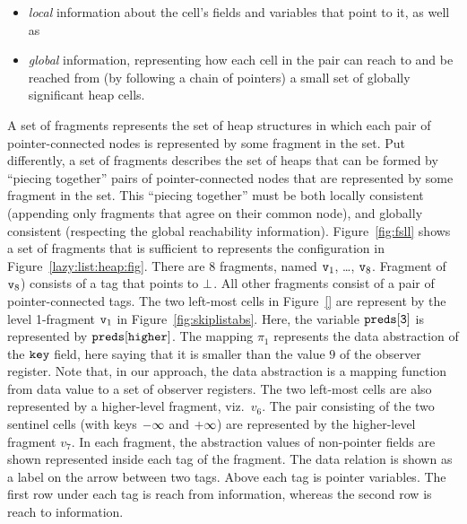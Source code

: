\begin{itemize}
\item {\em local} information about the cell's fields and variables that
  point to it, as well as
\item {\em global} information, representing how
  each cell in the pair can reach to and be reached from
  (by following a chain of pointers) a small set of globally significant
  heap cells.
\end{itemize}
 A set of fragments represents the set of heap
structures in which each pair of pointer-connected nodes is represented by some
fragment in the set.
Put differently, a set of fragments describes the set of heaps that can be formed by
``piecing together'' pairs of pointer-connected nodes that are represented
by some fragment in the set. This ``piecing together'' must
be both locally consistent (appending only fragments that agree on their
common node), and globally consistent (respecting the global reachability
information).
%
Figure~\ref{fig:fsll} shows a set of fragments that is sufficient to
represents the configuration in Figure~\ref{lazy:list:heap:fig}. There are $8$ fragments, named $\mathtt{v}_1$, \ldots , $\mathtt{v}_{8}$. Fragment of
$\mathtt{v}_{8}$) consists of a tag that points to $\bot$. All other fragments consist of a pair of pointer-connected tags. The two left-most cells
in Figure~\ref{} are represent by the level 1-fragment $\mathtt{v}_1$ in
Figure~\ref{fig:skiplistabs}. Here, the variable $\tt preds[3]$ is represented by $\tt preds[higher]$. The mapping $\pi_1$ represents the data abstraction of the $\tt key$ field, here saying that it is smaller than the value $9$ of the observer register. Note that, in our approach, the data abstraction is a mapping function from data value to a set of observer registers.
The two left-most cells are also represented by
a higher-level fragment, viz.\ $v_6$.
The pair consisting of the two sentinel cells (with keys $\tt -\infty$ and $\tt +\infty$) are represented by the higher-level fragment $v_7$. In each fragment, the abstraction values of non-pointer fields are shown represented inside each tag of the fragment. The data relation is shown as a label on the  arrow between two tags. Above each tag is pointer variables. The first row under each tag is reach from information, whereas the second row is reach to information.

